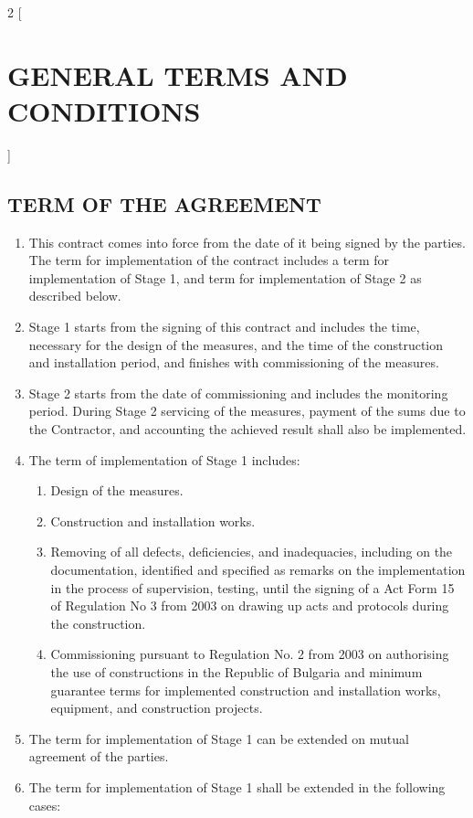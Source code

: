 \begin{multicols}{2} [\section{GENERAL TERMS AND CONDITIONS}]
      \subsection{TERM OF THE AGREEMENT}
      \begin{enumerate}
      \item This contract comes into force from the date of it being
        signed by the parties. The term for implementation of the
        contract includes a term for implementation of Stage 1, and
        term for implementation of Stage 2 as described below.
      \item Stage 1 starts from the signing of this contract and
        includes the time, necessary for the design of the measures,
        and the time of the construction and installation period, and
        finishes with commissioning of the measures.
      \item Stage 2 starts from the date of commissioning and includes
        the monitoring period. During Stage 2 servicing of the
        measures, payment of the sums due to the Contractor, and
        accounting the achieved result shall also be implemented.
      \item The term of implementation of Stage 1 includes:
        \begin{enumerate}
        \item Design of the measures.
        \item Construction and installation works.
        \item Removing of all defects, deficiencies, and inadequacies,
          including on the documentation, identified and specified as
          remarks on the implementation in the process of supervision,
          testing, until the signing of a Act Form 15 of Regulation No
          3 from 2003 on drawing up acts and protocols during the
          construction.
        \item Commissioning pursuant to Regulation No. 2 from 2003 on
          authorising the use of constructions in the Republic of
          Bulgaria and minimum guarantee terms for implemented
          construction and installation works, equipment, and
          construction projects.
        \end{enumerate}
      \item The term for implementation of Stage 1 can be extended on
        mutual agreement of the parties.
      \item The term for implementation of Stage 1 shall be extended
        in the following cases:

\end{enumerate}
\end{multicols}
